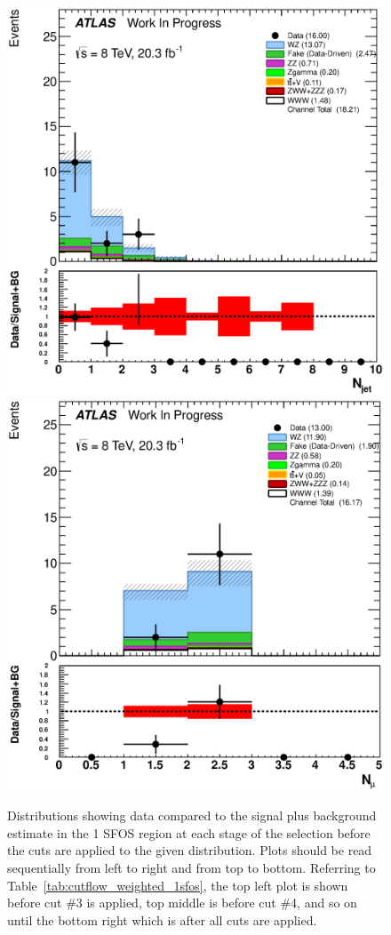 \begin{figure}[ht!]
\includegraphics[width=0.3\columnwidth]{figures/appendix_signal_selection/Nov24Update_FakeSys_KFacSys_LinearY_Rebin/output/jobs/MxM/DataFull_Rates_May13_FakeRatesExactly2Loose_MuonMxMBJetGt0_ElBJetGt0SubtractPC_MxM/PreselectionNov23_15_1SFOS_ChargeAbs1_BVeto85_ZVetoLow35High25GeV_METGt45GeV_DeltaPhi2p5_physics/weight_all/eps/NJets_histratio.eps}
\includegraphics[width=0.3\columnwidth]{figures/appendix_signal_selection/Nov24Update_FakeSys_KFacSys_LinearY_Rebin/output/jobs/MxM/DataFull_Rates_May13_FakeRatesExactly2Loose_MuonMxMBJetGt0_ElBJetGt0SubtractPC_MxM/PreselectionNov23_15_1SFOS_ChargeAbs1_BVeto85_ZVetoLow35High25GeV_METGt45GeV_DeltaPhi2p5_NJetLt2_physics/weight_all/eps/NMuons_histratio.eps}


\caption{Distributions showing data compared to the signal plus background estimate in the 1 SFOS region at each stage 
of the selection before the cuts are applied to the given distribution. Plots should be read sequentially from left to right
and from top to bottom. 
Referring to Table~\ref{tab:cutflow_weighted_1sfos}, the top left
plot is shown before cut \#3 is applied, top middle is before cut \#4, and
so on until the bottom right which is after all cuts are applied.}
\label{fig:1sfos}
\end{figure}



